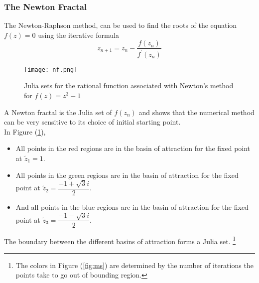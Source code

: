 \subsubsection{The Newton Fractal}
The Newton-Raphson method, can be used to find the roots of the equation $f(z)=0$ using the iterative formula
\begin{equation}
	z_{n+1}=z_n-\frac{f(z_n)}{f^\prime(z_n)}
\end{equation}
\begin{figure}[H]
	\centering
	\texttt{[image: nf.png]}
	\caption{Julia sets for the rational function associated with Newton’s method for $f(z)=z^3-1$}
	\label{fig:nf}
\end{figure}
A Newton fractal is the Julia set of $f(z_n)$ and shows that the numerical method can be very sensitive to its choice of initial starting point.\\
In Figure (\ref{fig:nf}),
\begin{itemize}
	\item All points in the red regions are in the basin of attraction for the fixed point at $\tilde{z}_1=1$.
	\item All points in the green regions are in the basin of attraction for the fixed point at $\tilde{z}_2=\dfrac{-1+\sqrt{3}i}{2}$.
	\item And all points in the blue regions are in the basin of attraction for the fixed point at $\tilde{z}_3=\dfrac{-1-\sqrt{3}i}{2}$.
\end{itemize}
The boundary between the different basins of attraction forms a Julia set.
{\let\thefootnote\relax\footnote{{The colors in Figure (\ref{fig:ms}) are determined by the number of iterations the points take to go out of bounding region}.}}